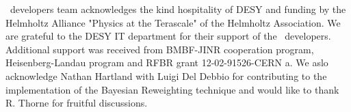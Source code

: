 %
%

\begin{acknowledgements}
\fitter\ developers team acknowledges the kind hospitality of DESY 
and funding by the Helmholtz Alliance "Physics at the Terascale" of the Helmholtz Association.
We are grateful to the DESY IT department for their support of the \fitter\  developers.
Additional support was received from BMBF-JINR cooperation program,
Heisenberg-Landau program and RFBR grant 12-02-91526-CERN a.
We aslo acknowledge Nathan Hartland with Luigi Del Debbio for contributing to the 
implementation of the Bayesian Reweighting technique and
would like to thank R. Thorne for fruitful discussions.
\end{acknowledgements}



